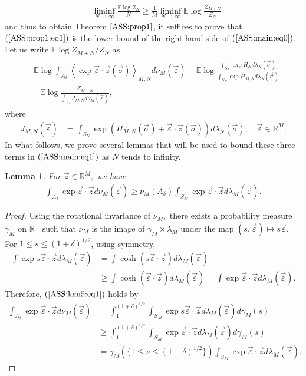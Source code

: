 \documentclass[12pt]{article}
\newcommand{\veps}{\vec{\varepsilon}}
\newcommand{\vsi}{{\vec{\sigma}}}
\newcommand{\vz}{\vec{z}}
\newtheorem{lemma}{\bf Lemma}
\newenvironment{Proof of lemma}{\noindent{\bf Proof of Lemma}}{\hfill$\Box$\newline}
\newenvironment{Proof of theorem}{\noindent{\bf Proof of Theorem}}{\hfill{\footnotesize${\square}$}\newline}
\newenvironment{Proof of theorems}{\noindent{\bf Proof of Theorems}}{\hfill$\Box$\newline}
\newenvironment{Proof of proposition}{\noindent{\bf Proof of Proposition}}{\hfill$\Box$\newline}
\newenvironment{Proof of propositions}{\noindent{\bf Proof of Propositions}}{\hfill$\Box$\newline}
\newenvironment{Proof of exercise}{\noindent{\it Proof of Exercise:}}{\hfill$\Box$}
\numberwithin{equation}{section}
\begin{document}
\begin{align}\label{ASS:main:eq0}
&\liminf_{N\rightarrow\infty}\frac{\mathbb{E}\log Z_N}{N}\geq\frac{1}{M}\liminf_{N\rightarrow\infty}\mathbb{E}\log \frac{Z_{M+N}}{Z_N}
\end{align}
and thus to obtain Theorem $\ref{ASS:prop1}$, it suffices to prove that $(\ref{ASS:prop1:eq1})$ is the lower bound of the right-hand side of $(\ref{ASS:main:eq0})$.
Let us write $\mathbb{E}\log{Z_{M+N}}/{Z_N}$ as
\begin{align}
\begin{split}\label{ASS:main:eq1}
&\mathbb{E}\log \int_{A_\delta}\left< \exp\veps\cdot \vz(\vsi)\right>_{M,N}d\nu_M(\veps)-\mathbb{E}\log\frac{\int_{S_N}\exp H_Nd\lambda_N(\vsi)}{\int_{S_N}\exp H_{M,N}d\lambda_N(\vsi)}\\
&+\mathbb{E}\log\frac{Z_{M+N}}{\int_{A_\delta}J_{M,N}d\nu_M(\veps)},
\end{split}
\end{align}
where  
\begin{align*}
J_{M,N}(\veps)&=\int_{S_N}\exp(H_{M,N}(\vsi)+\veps\cdot \vz (\vsi))d\lambda_N(\vsi),\quad\veps\in\mathbb{R}^M.
\end{align*}
In what follows, we prove several lemmas that will be used to bound these three terms in $(\ref{ASS:main:eq1})$ as $N$ tends to infinity.

\begin{lemma}
\label{ASS:lem5} For $\vz\in\mathbb{R}^M,$ we have
\begin{align}
\label{ASS:lem5:eq1}
\int_{A_\delta}\exp \veps\cdot\vz d\nu_M(\veps)\geq  
\nu_M\left(A_\delta\right)\int_{S_M}\exp\veps\cdot \vz d\lambda_M(\veps).
\end{align}
\end{lemma}

\begin{proof}
Using the rotational invariance of $\nu_M,$ there  exists a probability measure $\gamma_M$ on $\mathbb{R}^+$ such that
$\nu_M$ is the image of $\gamma_M\times \lambda_M$ under the map $(s,\veps)
\mapsto s\veps.$ For $1\leq s\leq (1+\delta)^{1/2}$, using symmetry,
\begin{align*}
\int \exp s\veps\cdot\vz d\lambda_M(\veps)&=\int \cosh(s\veps\cdot\vz)d\lambda_M(\veps)\\
&\geq \int \cosh(\veps\cdot\vz)d\lambda_M(\veps)=\int \exp \veps\cdot\vz d\lambda_M(\veps).
\end{align*} 
Therefore, $(\ref{ASS:lem5:eq1})$ holds by
\begin{align*}
\int_{A_\delta}\exp \veps\cdot\vz d\nu_M(\veps)&=\int_{1}^{(1+\delta)^{1/2}}\int_{S_M}\exp s\veps\cdot \vz d\lambda_M(\veps)d\gamma_M(s)\\
&\geq\int_{1}^{(1+\delta)^{1/2}}\int_{S_M}\exp\veps\cdot \vz d\lambda_M(\veps)d\gamma_M(s)\\
&= \gamma_M(\{1\leq s\leq (1+\delta)^{1/2}\})\int_{S_M}\exp\veps\cdot \vz d\lambda_M(\veps).
\end{align*}
\end{proof}
\end{document}

